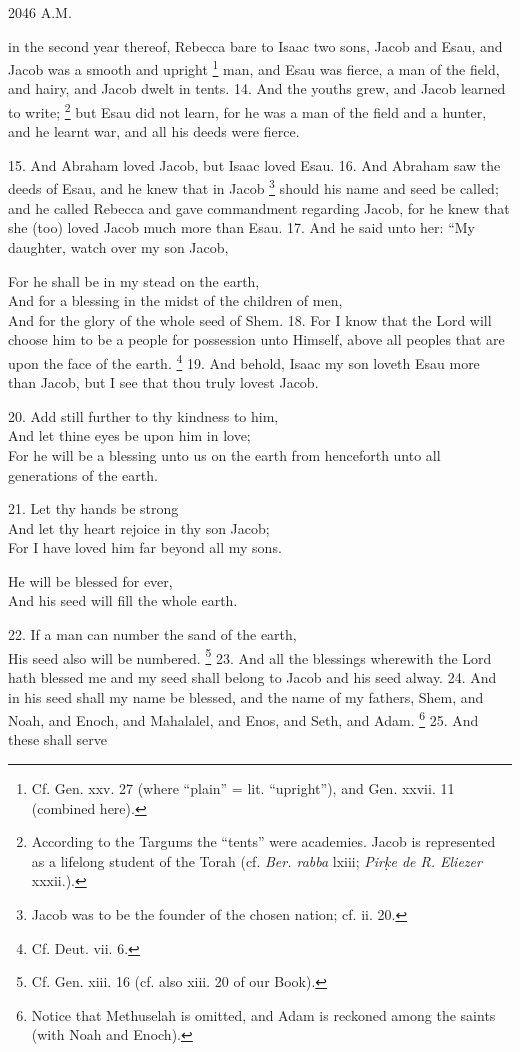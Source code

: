 2046 A.M.

in the second year thereof, Rebecca bare to Isaac two sons, Jacob and Esau, and Jacob was a smooth and upright \footnote{Cf. Gen. xxv. 27 (where ``plain'' = lit. ``upright''), and Gen. xxvii. 11 (combined here).} man, and Esau was fierce, a man of the field, and hairy, and Jacob dwelt in tents. 14. And the youths grew, and Jacob learned to write; \footnote{According to the Targums the ``tents'' were academies. Jacob is represented as a lifelong student of the Torah (cf. \emph{Ber. rabba} lxiii; \emph{Pir\d{k}e de R. Eliezer} xxxii.).} but Esau did not learn, for he was a man of the field and a hunter, and he learnt war, and all his deeds were fierce.


15. And Abraham loved Jacob, but Isaac loved Esau. 16. And Abraham saw the deeds of Esau, and he knew that in Jacob \footnote{Jacob was to be the founder of the chosen nation; cf. ii. 20.} should his name and seed be called; and he called Rebecca and gave commandment regarding Jacob, for he knew that she (too) loved Jacob much more than Esau. 17. And he said unto her: ``My daughter, watch over my son Jacob,

For he shall be in my stead on the earth,\\
And for a blessing in the midst of the children of men,\\
And for the glory of the whole seed of Shem. 18. For I know that the Lord will choose him to be a people for possession unto Himself, above all peoples that are upon the face of the earth. \footnote{Cf. Deut. vii. 6.} 19. And behold, Isaac my son loveth Esau more than Jacob, but I see that thou truly lovest Jacob.

20. Add still further to thy kindness to him,\\
And let thine eyes be upon him in love;\\
For he will be a blessing unto us on the earth from henceforth unto all generations of the earth.

21. Let thy hands be strong\\
And let thy heart rejoice in thy son Jacob;\\
For I have loved him far beyond all my sons.

He will be blessed for ever,\\
And his seed will fill the whole earth.

22. If a man can number the sand of the earth,\\
His seed also will be numbered. \footnote{Cf. Gen. xiii. 16 (cf. also xiii. 20 of our Book).} 23. And all the blessings wherewith the Lord hath blessed me and my seed shall belong to Jacob and his seed alway. 24. And in his seed shall my name be blessed, and the name of my fathers, Shem, and Noah, and Enoch, and Mahalalel, and Enos, and Seth, and Adam. \footnote{Notice that Methuselah is omitted, and Adam is reckoned among the saints (with Noah and Enoch).} 25. And these shall serve

